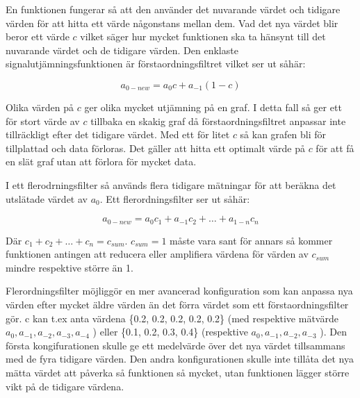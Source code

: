 En funktionen fungerar så att den använder det nuvarande värdet och
tidigare värden för att hitta ett värde någonstans mellan dem. Vad det 
nya värdet blir beror ett värde $c$ vilket säger hur mycket funktionen ska 
ta hänsynt till det nuvarande värdet och de tidigare värden. Den enklaste
signalutjämningsfunktionen är förstaordningsfiltret vilket ser ut såhär: 

\begin{equation}
	a_{0-new} = a_{0}c + a_{-1}(1 - c)
\end{equation}

Olika värden på $c$ ger olika mycket utjämning på en graf. 
I detta fall så ger ett för stort värde av $c$ tillbaka en skakig graf 
då förstaordningsfiltret anpassar inte tillräckligt efter det tidigare värdet.
Med ett för litet $c$ så kan grafen bli för tillplattad och data förloras. 
Det gäller att hitta ett optimalt värde på $c$ för att få en slät graf
utan att förlora för mycket data.

I ett flerodrningsfilter så används flera tidigare mätningar för att
beräkna det utslätade värdet av $a_{0}$. Ett flerordningsfilter ser ut såhär:

\begin{equation}
	a_{0-new} = a_{0}c_{1} + a_{-1}c_{2} + … + a_{1-n}c_{n} 
\end{equation}

Där $c_1 + c_2 + … + c_n = c_{sum}$.
 $ c_{sum} = 1$
 måste vara sant för annars så kommer
funktionen antingen att reducera eller amplifiera värdena för värden
av $c_{sum}$ mindre respektive större än 1.

Flerordningsfilter möjliggör en mer avancerad konfiguration som kan anpassa
nya värden efter mycket äldre värden än det förra värdet som ett
förstaordningsfilter gör. 
c kan t.ex anta värdena \{0.2, 0.2, 0.2, 0.2, 0.2\} (med respektive mätvärde 
$a_0, a_{-1}, a_{-2}, a_{-3}, a_{-4}$
 ) eller \{0.1, 0.2, 0.3, 0.4\}
 (respektive $ a_0, a_{-1}, a_{-2}, a_{-3} $ ). 
Den första kongifurationen  skulle ge ett medelvärde över det nya värdet 
tillsammans med de fyra tidigare värden. Den andra konfigurationen skulle
 inte tillåta det nya mätta värdet att påverka så funktionen 
så mycket, utan funktionen lägger större
 vikt på de tidigare värdena.

